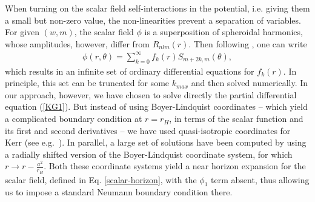 When turning on the scalar field self-interactions in the potential, i.e. giving them a small but non-zero value, the non-linearities prevent a separation of variables.
For given $(w,m)$,
the scalar field $\phi$ is a superposition of
spheroidal harmonics, whose amplitudes, however, differ from $R_{nlm}(r)$.
Then following \cite{Volkov:2002aj}, one can write
% 
\begin{eqnarray}
\phi(r,\theta)=\sum_{k=0}^\infty f_k(r)S_{m+2k,m} (\theta),
\end{eqnarray}
%
which results in an infinite set of ordinary differential
equations for $f_k(r)$.
In principle, this set can be truncated for some $k_{max}$
and then solved numerically.
In our approach, however, we have chosen to solve
 directly the partial differential equation (\ref{KG1}). But instead of using Boyer-Lindquist coordinates -- 
 which yield a complicated boundary condition at  $r=r_H$,  in terms of the scalar function and its first and second derivatives -- we have used quasi-isotropic coordinates for Kerr (see e.g.~\cite{Cook:2000vr}).  In parallel, a large set of solutions have been computed  by using a radially shifted version of the Boyer-Lindquist coordinate system, for which $r\to r-\frac{a^2}{r_H}$.
%
Both these coordinate systems yield a near horizon expansion for the scalar field, defined in Eq. \eqref{scalar-horizon}, with the $\phi_1$ term absent, thus allowing us to impose a standard Neumann boundary condition there.
                                                                
